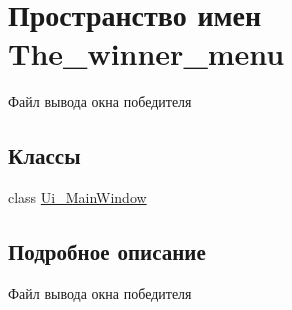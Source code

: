 \hypertarget{namespace_the__winner__menu}{}\section{Пространство имен The\+\_\+winner\+\_\+menu}
\label{namespace_the__winner__menu}


Файл вывода окна победителя  


\subsection*{Классы}
\begin{DoxyCompactItemize}
\item 
class \mbox{\hyperlink{class_the__winner__menu_1_1_ui___main_window}{Ui\+\_\+\+Main\+Window}}
\end{DoxyCompactItemize}


\subsection{Подробное описание}
Файл вывода окна победителя 